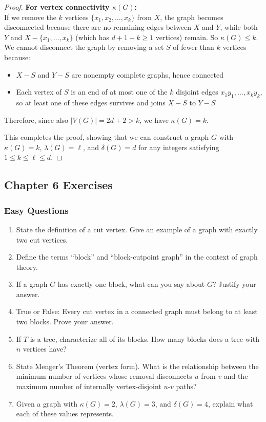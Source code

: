 \documentclass{article}
\theoremstyle{definition}
\begin{document}
\begin{proof}
\textbf{For vertex connectivity $\kappa(G)$:}\\
If we remove the $k$ vertices $\{x_1, x_2, \ldots, x_k\}$ from $X$, the graph becomes disconnected because there are no remaining edges between $X$ and $Y$, while both $Y$ and $X - \{x_1, \ldots, x_k\}$ (which has $d+1-k \geq 1$ vertices) remain. So $\kappa(G) \leq k$.
We cannot disconnect the graph by removing a set $S$ of fewer than $k$ vertices because:
\begin{itemize}
  \item $X - S$ and $Y - S$ are nonempty complete graphs, hence connected
  \item Each vertex of $S$ is an end of at most one of the $k$ disjoint edges $x_1y_1, \ldots, x_ky_k$, so at least one of these edges survives and joins $X - S$ to $Y - S$
\end{itemize}
Therefore, since also $|V(G)| = 2d + 2 > k$, we have $\kappa(G) = k$.

This completes the proof, showing that we can construct a graph $G$ with $\kappa(G) = k$, $\lambda(G) = \ell$, and $\delta(G) = d$ for any integers satisfying $1 \leq k \leq \ell \leq d$.
\end{proof}

\subsection{Chapter 6 Exercises}

\subsubsection{Easy Questions}
\begin{enumerate}
\item State the definition of a cut vertex. Give an example of a graph with exactly two cut vertices.

\item Define the terms ``block'' and ``block-cutpoint graph'' in the context of graph theory.

\item If a graph $G$ has exactly one block, what can you say about $G$? Justify your answer.

\item True or False: Every cut vertex in a connected graph must belong to at least two blocks. Prove your answer.

\item If $T$ is a tree, characterize all of its blocks. How many blocks does a tree with $n$ vertices have?

\item State Menger's Theorem (vertex form). What is the relationship between the minimum number of vertices whose removal disconnects $u$ from $v$ and the maximum number of internally vertex-disjoint $u$-$v$ paths?

\item Given a graph with $\kappa(G) = 2$, $\lambda(G) = 3$, and $\delta(G) = 4$, explain what each of these values represents.
\end{enumerate}
\end{document}
